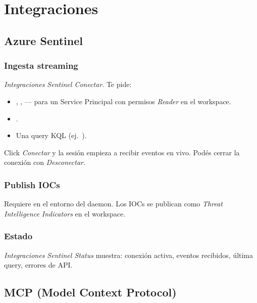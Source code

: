 \chapter{Integraciones}
\label{sec:man-integraciones}

\section{Azure Sentinel}

\subsection{Ingesta streaming}

\emph{Integraciones \textrightarrow{} Sentinel \textrightarrow{}
Conectar}. Te pide:

\begin{itemize}
    \item {}, ,
     — para un Service Principal con
    permisos \emph{Reader} en el workspace.
    \item {}.
    \item Una query KQL (ej.\ ).
\end{itemize}

Click \emph{Conectar} y la sesión empieza a recibir eventos en
vivo. Podés cerrar la conexión con \emph{Desconectar}.

\subsection{Publish IOCs}

Requiere  en el entorno
del daemon. Los IOCs se publican como \emph{Threat Intelligence
Indicators} en el workspace.

\subsection{Estado}

\emph{Integraciones \textrightarrow{} Sentinel \textrightarrow{}
Status} muestra: conexión activa, eventos recibidos, última query,
errores de API.

\section{MCP (Model Context Protocol)}

